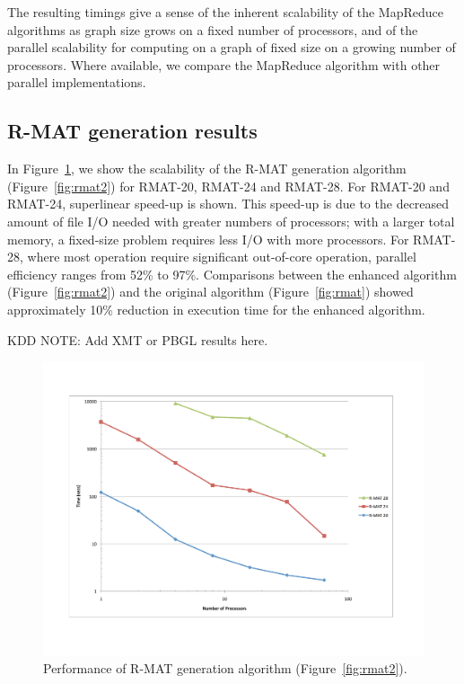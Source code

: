 The resulting timings give a sense of the inherent scalability of the
MapReduce algorithms as graph size grows on a fixed number of
processors, and of the parallel scalability for computing on a graph
of fixed size on a growing number of processors.  Where available, we
compare the MapReduce algorithm with other parallel implementations.

\subsection{R-MAT generation results}

In Figure~\ref{f:rmat}, we show the scalability of the R-MAT generation 
algorithm (Figure~\ref{fig:rmat2}) for RMAT-20, RMAT-24 and RMAT-28.  For
RMAT-20 and RMAT-24, superlinear speed-up is shown.  This speed-up is due
to the decreased amount of file I/O needed with greater numbers of 
processors; with a larger total memory, a fixed-size problem requires
less I/O with more processors.  For RMAT-28, where most operation require
significant out-of-core operation, parallel efficiency ranges from 52\% to
97\%.  Comparisons between the enhanced algorithm (Figure~\ref{fig:rmat2}) and
the original algorithm (Figure~\ref{fig:rmat}) showed approximately 
10\% reduction in execution time for the enhanced algorithm.

KDD NOTE:  Add XMT or PBGL results here.

\begin{figure}[h!]
\includegraphics[width=\textwidth]{fig_rmat.pdf}
\caption{Performance of R-MAT generation algorithm (Figure~\ref{fig:rmat2}).}
\label{f:rmat}
\end{figure}

